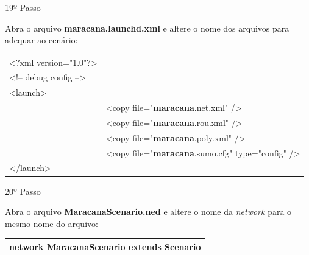 \documentclass[
12pt,				%
openright,			%
oneside,			%
a4paper,			%
brazil,				%
]{abntex2}
\begin{document}
{\begin{anexosenv}
            	\begin{description}
                    \item[19º Passo]
                \end{description}
                \par Abra o arquivo \textbf{maracana.launchd.xml} e altere o nome dos arquivos para adequar ao cenário:
		
	            \begin{table}[H]
		            \renewcommand{\arraystretch}{1.1}
	                \begin{tabular}{|lp{10.8cm}|}
		                \hline
	                        <?xml version="1.0"?> &  \\
                            <!-- debug config --> &   \\
                            <launch> &                \\
	                             & <copy file="\textbf{maracana}.net.xml" /> \\
                                 & <copy file="\textbf{maracana}.rou.xml" /> \\
                                 & <copy file="\textbf{maracana}.poly.xml" /> \\
                                 & <copy file="\textbf{maracana}.sumo.cfg" type="config" /> \\
                            </launch> &              \\
		                \hline
		            \end{tabular}
	            \end{table}
                
                \newpage
            	\begin{description}
                    \item[20º Passo]
                \end{description}
                \par Abra o arquivo \textbf{MaracanaScenario.ned} e altere o nome da \textit{network} para o mesmo nome do arquivo:
                
	            \begin{table}[H]
		            \renewcommand{\arraystretch}{1.5}
	                \begin{tabular}{|p{15.5cm}|}
		                \hline
                        network \textbf{MaracanaScenario} extends Scenario \\
		                \hline
		            \end{tabular}
	            \end{table}
                

\end{anexosenv}}
\end{document}
